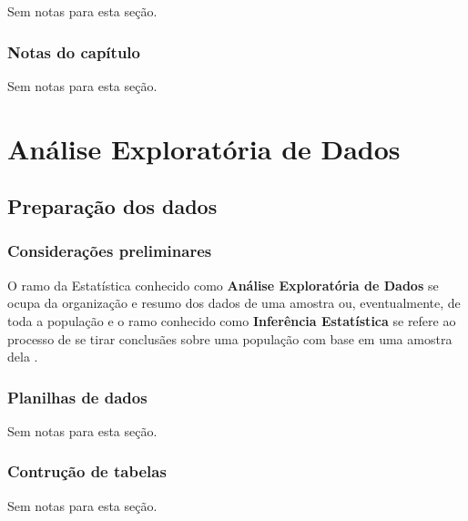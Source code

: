 \documentclass[
]{latex/krantz}
\renewenvironment{quote}{\begin{VF}}{\end{VF}}
\theoremstyle{definition}
\theoremstyle{definition}
\theoremstyle{definition}
\theoremstyle{definition}
\theoremstyle{remark}
\begin{document}
Sem notas para esta seção.

\hypertarget{notas-do-capuxedtulo}{%
\section{Notas do capítulo}\label{notas-do-capuxedtulo}}

Sem notas para esta seção.

\hypertarget{part-anuxe1lise-exploratuxf3ria-de-dados}{%
\part{Análise Exploratória de Dados}\label{part-anuxe1lise-exploratuxf3ria-de-dados}}

\hypertarget{preparauxe7uxe3o-dos-dados}{%
\chapter{Preparação dos dados}\label{preparauxe7uxe3o-dos-dados}}

\hypertarget{considerauxe7uxf5es-preliminares}{%
\section{Considerações preliminares}\label{considerauxe7uxf5es-preliminares}}

\begin{quote}
O ramo da Estatística conhecido como \textbf{Análise Exploratória de Dados} se ocupa da organização e resumo dos dados de uma amostra ou, eventualmente, de toda a população e o ramo conhecido como \textbf{Inferência Estatística} se refere ao processo de se tirar conclusães sobre uma população com base em uma amostra dela \citep[p.~21]{MorettinSinger2022}.
\end{quote}

\hypertarget{planilhas-de-dados}{%
\section{Planilhas de dados}\label{planilhas-de-dados}}

Sem notas para esta seção.

\hypertarget{contruuxe7uxe3o-de-tabelas}{%
\section{Contrução de tabelas}\label{contruuxe7uxe3o-de-tabelas}}

Sem notas para esta seção.
\end{document}
